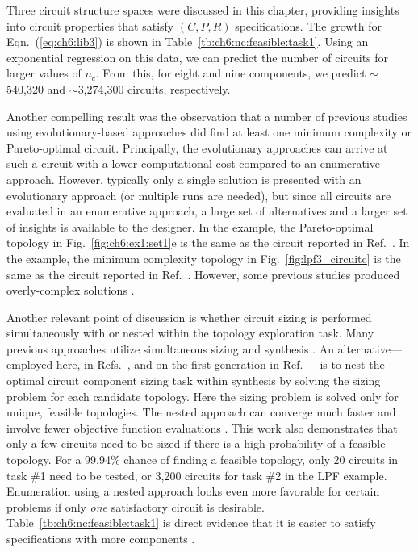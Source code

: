 Three circuit structure spaces were discussed in this chapter, providing insights into circuit properties that satisfy $(C,P,R)$ specifications.
The growth for Eqn.~(\ref{eq:ch6:lib3}) is shown in Table~\ref{tb:ch6:nc:feasible:task1}.
Using an exponential regression on this data, we can predict the number of circuits for larger values of $n_c$.
From this, for eight and nine components, we predict $\sim$540,320 and $\sim$3,274,300 circuits, respectively.

Another compelling result was the observation that a number of previous studies using evolutionary-based approaches did find at least one  minimum complexity or Pareto-optimal circuit.
Principally, the evolutionary approaches can arrive at such a circuit with a lower computational cost compared to an enumerative approach.
However, typically only a single solution is presented with an evolutionary approach (or multiple runs are needed), but since all circuits are evaluated in an enumerative approach, a large set of alternatives and a larger set of insights is available to the designer.
In the  example, the Pareto-optimal topology in Fig.~\ref{fig:ch6:ex1:set1}e is the same as the circuit reported in Ref.~\cite{Grimbleby1995a}.
In the  example, the minimum complexity topology in Fig.~\ref{fig:lpf3_circuitc} is the same as the circuit reported in Ref.~\cite{Das2007a}.
However, some previous studies produced overly-complex solutions \cite{Lohn1999a}.

Another relevant point of discussion is whether circuit sizing is performed simultaneously with or nested within the topology exploration task.
Many previous approaches utilize simultaneous sizing and synthesis \cite{Das2007a, Lohn1999a}.
An alternative---employed here, in Refs.~\cite{Grimbleby2000a, Goh2001a}, and on the first generation in Ref.~\cite{Das2007a}---is to nest the optimal circuit component sizing task within synthesis by solving the sizing problem for each candidate topology. 
Here the sizing problem is solved only for unique, feasible topologies. 
The nested approach can converge much faster and involve fewer objective function evaluations \cite{Grimbleby2000a}.
This work also demonstrates that only a few circuits need to be sized if there is a high probability of a feasible topology.
For a 99.94\% chance of finding a feasible topology, only 20 circuits in task \#1 need to be tested, or 3,200 circuits for task \#2 in the LPF example.
Enumeration using a nested approach looks even more favorable for certain problems if only \textit{one} satisfactory circuit is desirable.
Table~\ref{tb:ch6:nc:feasible:task1} is direct evidence that it is easier to satisfy specifications with more components \cite{Grimbleby1995a}.

